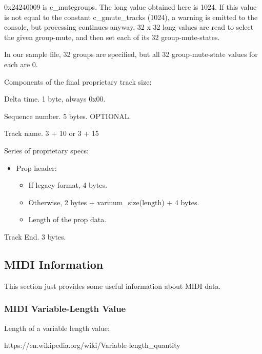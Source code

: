    0x24240009 is c\_mutegroups.  The long value obtained here is 1024.
   If this value is not equal to the constant c\_gmute\_tracks (1024), a
   warning is emitted to the console, but processing continues anyway,
   32 x 32 long values are read to select the given group-mute, and then set
   each of its 32 group-mute-states.

   In our sample file, 32 groups are specified, but all 32 group-mute-state
   values for each are 0.

Components of the final proprietary track size:

   \begin{enumber}
      \item Delta time.  1 byte, always 0x00.
      \item Sequence number.  5 bytes.  OPTIONAL.
      \item Track name. 3 + 10 or 3 + 15
      \item Series of proprietary specs:
      \begin{itemize}
         \item Prop header:
         \begin{itemize}
            \item If legacy format, 4 bytes.
            \item Otherwise, 2 bytes + varinum\_size(length) + 4 bytes.
            \item Length of the prop data.
         \end{itemize}
      \end{itemize}
      \item Track End. 3 bytes.
   \end{enumber}

\subsection{MIDI Information}
\label{subsec:midi_information}

   This section just provides some useful information about MIDI data.

\subsubsection{MIDI Variable-Length Value}
\label{subsec:midi_variable_length_value}

Length of a variable length value:

   https://en.wikipedia.org/wiki/Variable-length\_quantity

